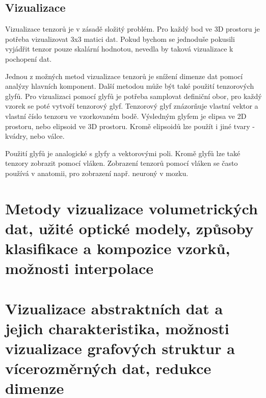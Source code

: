 \documentclass[10pt,a4paper, table]{article}
\begin{document}
\subsection{Vizualizace}
Vizualizace tenzorů je v zásadě složitý problém. Pro každý bod ve 3D prostoru je potřeba vizualizovat 3x3 matici dat. Pokud bychom se jednoduše pokusili vyjádřit tenzor pouze skalární hodnotou, nevedla by taková vizualizace k pochopení dat. \par
Jednou z možných metod vizualizace tenzorů je snížení dimenze dat pomocí analýzy hlavních komponent. Další metodou může být také použití tenzorových glyfů. Pro vizualizaci pomocí glyfů je potřeba samplovat definiční obor, pro každý vzorek se poté vytvoří tenzorový glyf. Tenzorový glyf znázorňuje vlastní vektor a vlastní číslo tenzoru ve vzorkovaném bodě. Výsledným glyfem je elipsa ve 2D prostoru, nebo elipsoid ve 3D prostoru. Kromě elipsoidů lze použít i jiné tvary - kvádry, nebo válce. \par
Použití glyfů je analogické s glyfy a vektorovými poli. Kromě glyfů lze také tenzory zobrazit pomocí vláken. Zobrazení tenzorů pomocí vláken se často používá v anatomii, pro zobrazení např. neuroný v mozku.


\clearpage
\section{Metody  vizualizace volumetrických dat, užité optické modely, způsoby klasifikace  a kompozice vzorků, možnosti interpolace}

\section{Vizualizace  abstraktních dat a  jejich  charakteristika, možnosti vizualizace grafových struktur a vícerozměrných dat, redukce dimenze}
\end{document}
